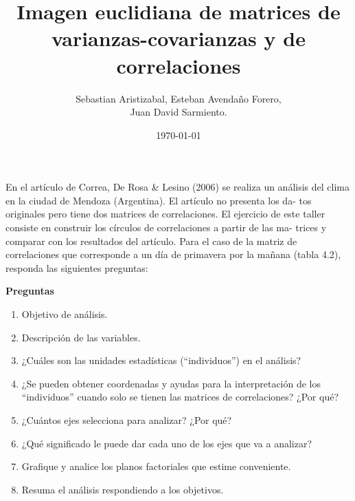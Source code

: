 \documentclass[letterpaper, 12pt]{article}
\title{Imagen euclidiana de matrices de varianzas-covarianzas y de correlaciones}
\author{Sebastian Aristizabal, Esteban Avendaño Forero,\\
Juan David Sarmiento.}
\date{\today}
\begin{document}


\maketitle

En el artículo de Correa, De Rosa \& Lesino (2006) se realiza un análisis del
clima en la ciudad de Mendoza (Argentina). El artículo no presenta los da-
tos originales pero tiene dos matrices de correlaciones. El ejercicio de este
taller consiste en construir los círculos de correlaciones a partir de las ma-
trices y comparar con los resultados del artículo. Para el caso de la matriz de
correlaciones que corresponde a un día de primavera por la mañana (tabla
4.2), responda las siguientes preguntas:

\newpage
\begin{center}
\textbf{Preguntas}
\end{center}

\begin{enumerate}

        \item Objetivo de análisis.
        
        \item Descripción de las variables.
        
        \item ¿Cuáles son las unidades estadísticas (“individuos”) en el análisis?
        
        \item ¿Se pueden obtener coordenadas y ayudas para la interpretación de
        los “individuos” cuando solo se tienen las matrices de correlaciones?
        ¿Por qué?
        
        \item ¿Cuántos ejes selecciona para analizar? ¿Por qué?
        
        \item ¿Qué significado le puede dar cada uno de los ejes que va a analizar?
        
        \item Grafique y analice los planos factoriales que estime conveniente.
        
        \item Resuma el análisis respondiendo a los objetivos.

\end{enumerate}
\end{document}
